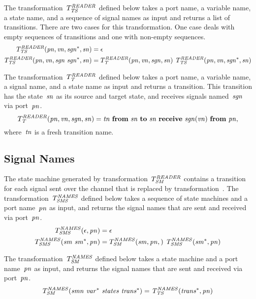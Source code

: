The transformation~$T_{\it{TS}}^{\it{READER}}$ defined below takes a port name, a variable name, a state name, and a sequence of signal names as input and returns a list of transitions.
There are two cases for this transformation.
One case deals with empty sequences of transitions and one with non-empty sequences.
%
\begin{align*}
T_{\it{TS}}^{\it{READER}}(\it{pn}, \it{vn}, \it{sgn^*}, \it{sn}) & = \epsilon\\
T_{\it{TS}}^{\it{READER}}(\it{pn}, \it{vn}, \it{sgn}~\it{sgn^*}, \it{sn}) & =
T_{\it{T}}^{\it{READER}}(\it{pn}, \it{vn}, \it{sgn}, \it{sn})~T_{\it{TS}}^{\it{READER}}(\it{pn}, \it{vn}, \it{sgn^*}, \it{sn})\\
\end{align*}

The transformation~$T_{\it{T}}^{\it{READER}}$ defined below takes a port name, a variable name, a signal name, and a state name as input and returns a transition.
This transition has the state~$\it{sn}$ as its source and target state, and receives signals named~$\it{sgn}$ via port~$\it{pn}$.
%
\[
T_{\it{T}}^{\it{READER}}(\it{pn}, \it{vn}, \it{sgn}, \it{sn}) =
\it{tn}~\textbf{from}~\it{sn}~\textbf{to}~\it{sn}~\textbf{receive}~\it{sgn}(\it{vn})~\textbf{from}~\it{pn},
\]
where~$\it{tn}$ is a fresh transition name.

\subsection{Signal Names}
The state machine generated by transformation~$T_{\it{SM}}^{\it{READER}}$ contains a transition for each signal sent over the channel that is replaced by transformation~\TGen.
The transformation~$T_{\it{SMS}}^{\it{NAMES}}$ defined below takes a sequence of state machines and a port name~$\it{pn}$ as input, and returns the signal names that are sent and received via port~$\it{pn}$.
%
\begin{align*}
T_{\it{SMS}}^{\it{NAMES}}(\epsilon, \it{pn}) & = \epsilon\\
T_{\it{SMS}}^{\it{NAMES}}(\it{sm}~\it{sm^*}, \it{pn}) & = T_{\it{SM}}^{\it{NAMES}}(\it{sm}, \it{pn},)~T_{\it{SMS}}^{\it{NAMES}}(\it{sm^*}, \it{pn})\\
\end{align*}

The transformation~$T_{\it{SM}}^{\it{NAMES}}$ defined below takes a state machine and a port name~$\it{pn}$ as input, and returns the signal names that are sent and received via port~$\it{pn}$.
%
\[
T_{\it{SM}}^{\it{NAMES}}(\it{smn}~\it{var^*}~\it{states}~\it{trans^*}) = T_{\it{TS}}^{\it{NAMES}}(\it{trans^*}, \it{pn})
\]

